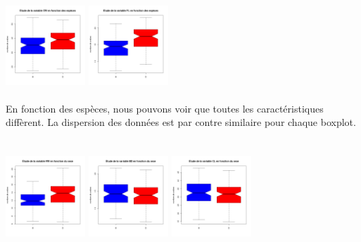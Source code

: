 \documentclass[a4paper, 10pt]{article}
\begin{document}
\includegraphics[height = 4cm, width = 3cm]{plots/boxplot_cw_espece.png}
\includegraphics[height = 4cm, width = 3cm]{plots/boxplot_fl_espece.png}\\
En fonction des esp\`eces, nous pouvons voir que toutes les caract\'eristiques diff\`erent.
La dispersion des donn\'ees est par contre similaire pour chaque boxplot.\\ \\
\includegraphics[height = 4cm, width = 3cm]{plots/boxplot_rw_sexe.png}
\includegraphics[height = 4cm, width = 3cm]{plots/boxplot_bd_sexe.png}
\includegraphics[height = 4cm, width = 3cm]{plots/boxplot_cl_sexe.png}
\end{document}
